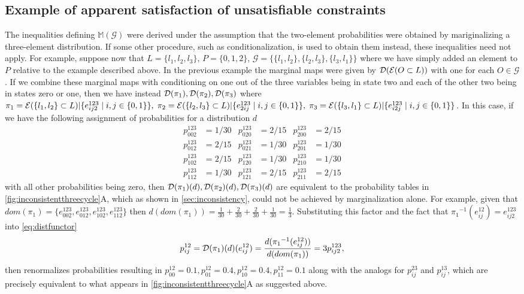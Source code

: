 \subsection{Example of apparent satisfaction of unsatisfiable constraints}\label{secsupp:apparentinconsistency}
The inequalities defining $\mathbb{M}(\mathcal{G})$ were derived under the assumption that the two-element probabilities were obtained by mariginalizing a three-element distribution.  If some other procedure, such as conditionalization, is used to obtain them instead, these inequalities need not apply. For example, suppose now that $L = \{l_1,l_2,l_3 \}$, $P = \{0,1,2\}$, $\mathcal{G} = \{\{l_1,l_2\},\{l_2,l_3\},\{l_3,l_1\}\}$ where we have simply added an element to $P$ relative to the example described above. In the previous example the marginal maps were given by $\mathcal{D} (\mathcal{E} (O \subset L))$ with one for each $O \in \mathcal{G}$. If we combine these marginal maps with conditioning on one out of the three variables being in state two and each of the other two being in states zero or one, then we have instead $\mathcal{D} (\pi_1), \mathcal{D} (\pi_2), \mathcal{D} (\pi_3)$ where $\pi_1 = \mathcal{E} (\{l_1,l_2\} \subset L)|\{ e^{123}_{ij2} \mid i,j \in \{ 0,1 \} \},\; \pi_2 = \mathcal{E} (\{l_2,l_3\} \subset L)|\{ e^{123}_{2ij} \mid i,j \in \{ 0,1 \} \},\; \pi_3 = \mathcal{E} (\{l_3,l_1\} \subset L)|\{ e^{123}_{i2j} \mid i,j \in \{ 0,1 \} \}$. In this case, if we have the following assignment of probabilities for a distribution $d$
\begin{equation}\label{eq:condprobs}
\begin{aligned}
p^{123}_{002} &= 1/30 & p^{123}_{020} &= 2/15 & p^{123}_{200} &= 2/15\\
p^{123}_{012} &= 2/15 & p^{123}_{021} &= 1/30 & p^{123}_{201} &= 1/30\\
p^{123}_{102} &= 2/15 & p^{123}_{120} &= 1/30 & p^{123}_{210} &= 1/30\\
p^{123}_{112} &= 1/30 & p^{123}_{121} &= 2/15 & p^{123}_{211} &= 2/15
\end{aligned}
\end{equation}
with all other probabilities being zero, then $\mathcal{D} (\pi_1)(d), \mathcal{D} (\pi_2)(d), \mathcal{D} (\pi_3)(d)$ are equivalent to the probability tables in \autoref{fig:inconsistentthreecycle}A, which as shown in \autoref{sec:inconsistency}, could not be achieved by marginalization alone. For example, given that $dom(\pi_1) = \{ e^{123}_{002}, e^{123}_{012}, e^{123}_{102}, e^{123}_{112} \}$ then $d(dom(\pi_1)) = \frac{1}{30} + \frac{2}{30} + \frac{2}{30} + \frac{1}{30} = \frac{1}{3}$. Substituting this factor and the fact that ${\pi_1}^{-1}(e^{12}_{ij}) = e^{123}_{ij2}$ into \autoref{eq:distfunctor}
$$
p^{12}_{ij} = \mathcal{D} (\pi_1)(d)(e^{12}_{ij}) = \frac{d({\pi_1}^{-1}(e^{12}_{ij}))}{d(dom(\pi_1))} = 3 p^{123}_{ij2},
$$
then renormalizes probabilities resulting in $p^{12}_{00} = 0.1, p^{12}_{01} = 0.4, p^{12}_{10} = 0.4, p^{12}_{11} = 0.1$ along with the analogs for $p^{23}_{ij}$ and $p^{13}_{ij}$, which are precisely equivalent to what appears in \autoref{fig:inconsistentthreecycle}A as suggested above.

